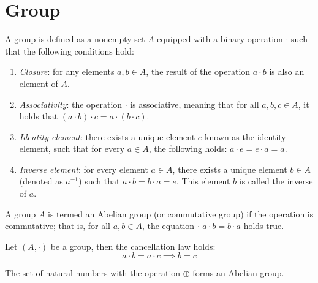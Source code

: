 \section{Group}

\begin{definition}
    A group is defined as a nonempty set $A$ equipped with a binary operation $\cdot$ such that the following conditions hold:
    \begin{enumerate}
        \item \textit{Closure}: for any elements $a, b \in A$, the result of the operation $a \cdot b$ is also an element of $A$.
        \item \textit{Associativity}: the operation $\cdot$ is associative, meaning that for all $a,b,c\in A$, it holds that $(a \cdot b) \cdot c = a \cdot (b \cdot c)$.
        \item \textit{Identity element}: there exists a unique element $e$ known as the identity element, such that for every $a\in A$, the following holds: $a \cdot e = e \cdot a = a$.
        \item \textit{Inverse element}: for every element $a \in A$, there exists a unique element $b \in A$ (denoted as $a^{-1}$) such that $a \cdot b = b \cdot a = e$. 
            This element $b$ is called the inverse of $a$.
    \end{enumerate}
\end{definition}

\begin{definition}
    A group $A$ is termed an Abelian group (or commutative group) if the operation is commutative; that is, for all $a, b \in A$, the equation $\cdot$ $a \cdot b = b \cdot a$ holds true.
\end{definition}

\begin{proposition}
    Let $(A, \cdot)$ be a group, then the cancellation law holds:
    \[a \cdot b = a \cdot c \implies b = c\]
\end{proposition}

\begin{proposition}
    The set of natural numbers with the operation $\oplus$ forms an Abelian group.
\end{proposition}